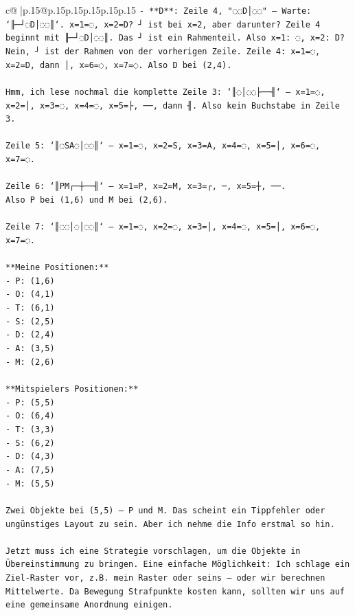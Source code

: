 \documentclass{article}
\begin{document}
{\begin{supertabular}{c@{$\;$}|p{.15\linewidth}@{}p{.15\linewidth}p{.15\linewidth}p{.15\linewidth}p{.15\linewidth}p{.15\linewidth}}
{{{\texttt{{-} **D**: Zeile 4, "◌◌D│◌◌" — Warte: `╟─┘◌D│◌◌║`. x=1=◌, x=2=D? ┘ ist bei x=2, aber darunter? Zeile 4 beginnt mit ╟─┘◌D│◌◌║. Das ┘ ist ein Rahmenteil. Also x=1: ◌, x=2: D? Nein, ┘ ist der Rahmen von der vorherigen Zeile. Zeile 4: x=1=◌, x=2=D, dann │, x=6=◌, x=7=◌. Also D bei (2,4).} \\
\\ 
\texttt{Hmm, ich lese nochmal die komplette Zeile 3: `║◌│◌◌├──╢` — x=1=◌, x=2=│, x=3=◌, x=4=◌, x=5=├, ──, dann ╢. Also kein Buchstabe in Zeile 3.} \\
\\ 
\texttt{Zeile 5: `║◌SA◌│◌◌║` — x=1=◌, x=2=S, x=3=A, x=4=◌, x=5=│, x=6=◌, x=7=◌.} \\
\\ 
\texttt{Zeile 6: `║PM┌─┼──╢` — x=1=P, x=2=M, x=3=┌, ─, x=5=┼, ──.} \\
\texttt{Also P bei (1,6) und M bei (2,6).} \\
\\ 
\texttt{Zeile 7: `║◌◌│◌│◌◌║` — x=1=◌, x=2=◌, x=3=│, x=4=◌, x=5=│, x=6=◌, x=7=◌.} \\
\\ 
\texttt{**Meine Positionen:**} \\
\texttt{{-} P: (1,6)} \\
\texttt{{-} O: (4,1)} \\
\texttt{{-} T: (6,1)} \\
\texttt{{-} S: (2,5)} \\
\texttt{{-} D: (2,4)} \\
\texttt{{-} A: (3,5)} \\
\texttt{{-} M: (2,6)} \\
\\ 
\texttt{**Mitspielers Positionen:**} \\
\texttt{{-} P: (5,5)} \\
\texttt{{-} O: (6,4)} \\
\texttt{{-} T: (3,3)} \\
\texttt{{-} S: (6,2)} \\
\texttt{{-} D: (4,3)} \\
\texttt{{-} A: (7,5)} \\
\texttt{{-} M: (5,5)} \\
\\ 
\texttt{Zwei Objekte bei (5,5) — P und M. Das scheint ein Tippfehler oder ungünstiges Layout zu sein. Aber ich nehme die Info erstmal so hin.} \\
\\ 
\texttt{Jetzt muss ich eine Strategie vorschlagen, um die Objekte in Übereinstimmung zu bringen. Eine einfache Möglichkeit: Ich schlage ein Ziel{-}Raster vor, z.B. mein Raster oder seins — oder wir berechnen Mittelwerte. Da Bewegung Strafpunkte kosten kann, sollten wir uns auf eine gemeinsame Anordnung einigen.} \\
}}}
\end{supertabular}}
\end{document}
